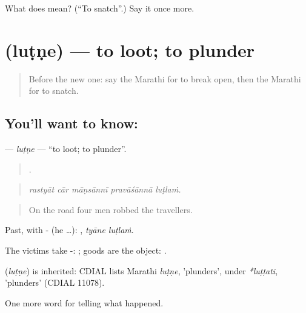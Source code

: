\begin{tcolorbox}[breakable,colback=teal!4,colframe=teal!35!black,title={Before you move on}]
What does  mean? (\textquotedblleft{}To snatch\textquotedblright{}.) Say it once more.
\end{tcolorbox}
\section[\texorpdfstring{\mr{लुटणे} (luṭṇe)}{लुटणे (luṭṇe)}]{ (luṭṇe) — to loot; to plunder}

\label{lesson:MR-C297-lutne}



\begin{quote}
Before the new one: say the Marathi for to break open, then the Marathi for to snatch.
\end{quote}

\subsection*{You'll want to know: }
\textbf{} — \emph{luṭṇe} — \textquotedblleft{}to loot; to plunder\textquotedblright{}.

\begin{quote}
    .
\end{quote}

\begin{quote}
\emph{rastyāt cār māṇsānnī pravāśānnā luṭlaṁ.}
\end{quote}

\begin{quote}
On the road four men robbed the travellers.
\end{quote}

Past, with - (he …):  , \emph{tyāne luṭlaṁ}.

The victims take -:  ; goods are the object:  .

\begin{cousinweb}
\textbf{} (\emph{luṭṇe}) is inherited: CDIAL lists Marathi \emph{luṭṇe}, 'plunders', under \emph{*luṭṭati}, 'plunders' (CDIAL 11078).
\end{cousinweb}

\begin{grammarlens}[title={What you've built}]
One more word for telling what happened.
\end{grammarlens}

